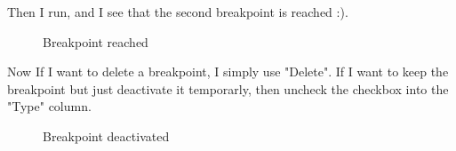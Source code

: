 \documentclass[10pt]{report}
\begin{document}
Then I run, and I see that the second breakpoint is reached :).\newline
\begin{figure}[H]
\centering
{}
\caption{Breakpoint reached}
\end{figure}

Now If I want to delete a breakpoint, I simply use "Delete".\newline
If I want to keep the breakpoint but just deactivate it temporarly, then uncheck the checkbox into the "Type" column.\newline
\begin{figure}[H]
\centering
{}
\caption{Breakpoint deactivated}
\end{figure}
\end{document}
